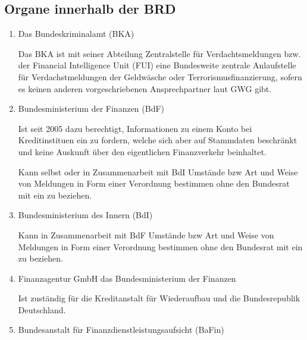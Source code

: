 \documentclass{article}
\begin{document}
        \subsection[Organe BRD]{Organe innerhalb der BRD}

            \begin{enumerate}

                \item Das Bundeskriminalamt (BKA)

                    Das BKA ist mit seiner Abteilung Zentralstelle für Verdachtsmeldungen bzw. der Financial Intelligence Unit (FUI) eine Bundesweite zentrale Anlaufstelle für Verdachstmeldungen der Geldwäsche oder Terrorismusfinanzierung, sofern es keinen anderen vorgeschriebenen Ansprechpartner laut GWG gibt.

                \item Bundesministerium der Finanzen (BdF)

                    Ist seit 2005 dazu berechtigt, Informationen zu einem Konto bei Kreditinstituen ein zu fordern, welche sich aber auf Stammdaten beschränkt und keine Auskunft über den eigentlichen Finanzverkehr beinhaltet.

                    Kann selbst oder in Zusammenarbeit mit BdI Umstände bzw Art und Weise von Meldungen in Form einer Verordnung bestimmen ohne den Bundesrat mit ein zu beziehen.

                \item Bundesministerium des Innern (BdI)

                    Kann in Zusammenarbeit mit BdF Umstände bzw Art und Weise von Meldungen in Form einer Verordnung bestimmen ohne den Bundesrat mit ein zu beziehen.                

                \item Finanzagentur GmbH das Bundesministerium der Finanzen

                    Ist zuständig für die Kreditanstalt für Wiederaufbau und die Bundesrepublik Deutschland.

                \item Bundesanstalt für Finanzdienstleistungsaufsicht (BaFin)


\end{enumerate}
\end{document}
